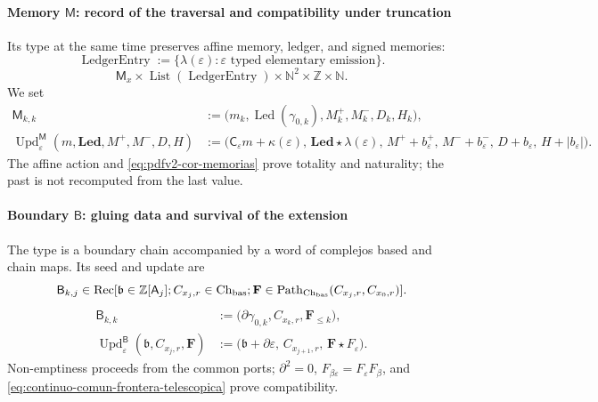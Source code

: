 \paragraph{Memory \(\mathsf M\): record of the traversal and compatibility under truncation}
Its type at the same time preserves affine memory, ledger, and signed memories:
\begin{equation}
\label{eq:pdfv2-terminal-tipo-ledger-entry}
 \operatorname{LedgerEntry}:=
 \{\lambda(\varepsilon):\varepsilon\text{ typed elementary emission}\}.
\end{equation}
\[
 \mathsf M_x\times\operatorname{List}(\operatorname{LedgerEntry})
 \times\mathbb N^2\times\mathbb Z\times\mathbb N.
\]
We set
\begin{align}
 \mathsf M_{k,k}&:=
 \bigl(m_k,\operatorname{Led}(\gamma_{0,k}),
       M_k^+,M_k^-,D_k,H_k\bigr),
 \label{eq:pdfv2-terminal-semilla-m}\\
 \operatorname{Upd}^{\mathsf M}_{\varepsilon}
 (m,\mathbf{Led},M^+,M^-,D,H)
 &:=
 \bigl(\mathsf C_\varepsilon m+\kappa(\varepsilon),\,
 \mathbf{Led}\star\lambda(\varepsilon),\,
 M^++b_\varepsilon^+,\,M^-+b_\varepsilon^-,\,
 D+b_\varepsilon,\,H+|b_\varepsilon|\bigr).
 \label{eq:pdfv2-terminal-update-m}
\end{align}
The affine action and \eqref{eq:pdfv2-cor-memorias} prove totality and
naturality; the past is not recomputed from the last value.

\paragraph{Boundary \(\mathsf B\): gluing data and survival of the extension}
The type is a boundary chain accompanied by a word of complejos
based and chain maps. Its seed and update are
\[
 \mathsf B_{k,j}\in
 \operatorname{Rec}[\mathfrak b\in\mathbb Z[\mathsf A_j];
 C_{x_j,r}\in\operatorname{Ch}_{\rm bas};
 \mathbf F\in\operatorname{Path}_{\operatorname{Ch}_{\rm bas}}
 (C_{x_j,r},C_{x_0,r})].
\]
\begin{align}
 \mathsf B_{k,k}&:=
 \bigl(\partial\gamma_{0,k},C_{x_k,r},\mathbf F_{\leq k}\bigr),
 \label{eq:pdfv2-terminal-semilla-b}\\
 \operatorname{Upd}^{\mathsf B}_{\varepsilon}
 (\mathfrak b,C_{x_j,r},\mathbf F)
 &:=
 \bigl(\mathfrak b+\partial\varepsilon,\,
 C_{x_{j+1},r},\,\mathbf F\star F_\varepsilon\bigr).
 \label{eq:pdfv2-terminal-update-b}
\end{align}
Non-emptiness proceeds from the common ports; \(\partial^2=0\),
\(F_{\beta\varepsilon}=F_\varepsilon F_\beta\), and
\eqref{eq:continuo-comun-frontera-telescopica} prove compatibility.

